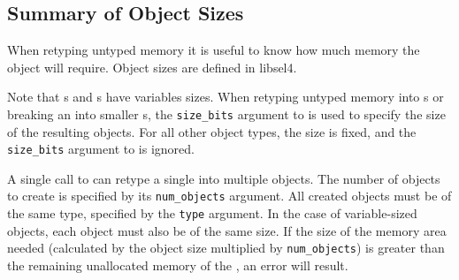 \subsection{Summary of Object Sizes}
\label{sec:object_sizes}

When retyping untyped memory it is useful to know how much memory the
object will require. Object sizes are defined in libsel4.

Note that s and s have variables sizes.
When retyping untyped memory into s or breaking an
 into smaller s, the
\texttt{size\_bits} argument to
 is used to specify
the size of the resulting objects.
For all other object types, the size is fixed, and the \texttt{size\_bits}
argument to  is ignored.

A single call to  can retype a
single  into multiple objects. The number of objects
to create is specified by its \texttt{num\_objects} argument. All created
objects must be of the same type, specified by the \texttt{type} argument. In
the case of variable-sized objects, each object must also be of the same size.
If the size of the memory area needed (calculated by the object size multiplied
by \texttt{num\_objects}) is greater than the remaining unallocated memory of
the , an error will result.
